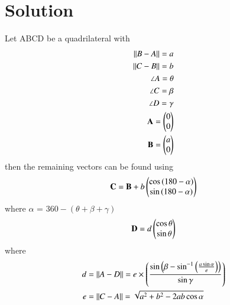 \documentclass[journal,12pt,twocolumn]{IEEEtran}
\begin{document}
\section{Solution}
\begin{lemma}
    Let ABCD be a quadrilateral with 
    \begin{align}
        \lVert B-A\rVert = a\\
        \lVert C-B\rVert = b\\
        \angle A = \theta\\
        \angle C = \beta\\
        \angle D = \gamma\\
        \mathbf{A} = \begin{pmatrix}0\\
                         0\end{pmatrix}\\
        \mathbf{B} = \begin{pmatrix}a\\
                         0\end{pmatrix}   
    \end{align}
    then the remaining vectors can be found using 
    \begin{align}
        \mathbf{C} = \mathbf{B}+b\begin{pmatrix}\cos{(180-\alpha)}\\
                                  \sin{(180-\alpha)}\end{pmatrix}
    \end{align}
    where $\alpha$ = $360-(\theta+\beta+\gamma)$
    \begin{align}
        \mathbf{D} = d\begin{pmatrix}\cos{\theta}\\
                          \sin{\theta}\end{pmatrix}
    \end{align}
    where 
    \begin{align}
        d &= \lVert A-D\rVert = e\times\left(\frac{\sin{\ensuremath{\left(\beta-\sin^{-1}\left({\frac{a\sin\alpha}{e}}\right)\right)}}}{\sin\gamma}\right)\\
        e &= \lVert C-A\rVert = \sqrt{a^2+b^2-2ab\cos{\alpha}}
    \end{align}
\end{lemma}
\end{document}
